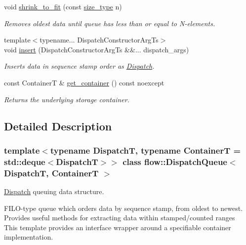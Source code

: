 \begin{DoxyCompactItemize}
void \hyperlink{classflow_1_1_dispatch_queue_a66f89e3d5c95709662227ce275f00607}{shrink\+\_\+to\+\_\+fit} (const \hyperlink{classflow_1_1_dispatch_queue_afdc67058e3461410fdd6170046df55bc}{size\+\_\+type} n)
\begin{DoxyCompactList}\small\item\em Removes oldest data until queue has less than or equal to N-\/elements. \end{DoxyCompactList}\item 
{\footnotesize template$<$typename... Dispatch\+Constructor\+Arg\+Ts$>$ }\\void \hyperlink{classflow_1_1_dispatch_queue_a5221c73d3790e6795c48229a2bcd7c0e}{insert} (Dispatch\+Constructor\+Arg\+Ts \&\&... dispatch\+\_\+args)
\begin{DoxyCompactList}\small\item\em Inserts data in sequence stamp order as \hyperlink{classflow_1_1_dispatch}{Dispatch}. \end{DoxyCompactList}\item 
\mbox{\label{classflow_1_1_dispatch_queue_a392c5f0f8ba079784188dd946684fade}} 
const ContainerT \& \hyperlink{classflow_1_1_dispatch_queue_a392c5f0f8ba079784188dd946684fade}{get\+\_\+container} () const noexcept
\begin{DoxyCompactList}\small\item\em Returns the underlying storage container. \end{DoxyCompactList}\end{DoxyCompactItemize}


\subsection{Detailed Description}
\subsubsection*{template$<$typename DispatchT, typename ContainerT = std\+::deque$<$\+Dispatch\+T$>$$>$\newline
class flow\+::\+Dispatch\+Queue$<$ Dispatch\+T, Container\+T $>$}

\hyperlink{classflow_1_1_dispatch}{Dispatch} queuing data structure. 

F\+I\+L\+O-\/type queue which orders data by sequence stamp, from oldest to newest. Provides useful methods for extracting data within stamped/counted ranges ~\newline
 This template provides an interface wrapper around a specifiable container implementation.


